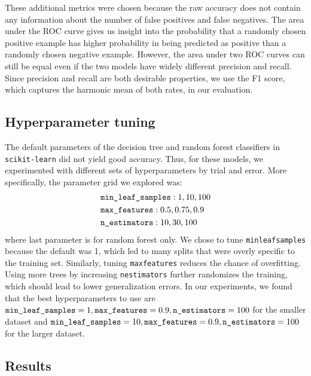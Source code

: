 \documentclass{article} %
\begin{document}
These additional metrics were chosen because the raw accuracy does not contain any information about the number of false positives and false negatives. The area under the ROC curve gives us insight into the probability that a randomly chosen positive example has higher probability in being predicted as positive than a randomly chosen negative example. However, the area under two ROC curves can still be equal even if the two models have widely different precision and recall. Since precision and recall are both desirable properties, we use the F1 score, which captures the harmonic mean of both rates, in our evaluation.

\subsection{Hyperparameter tuning}

The default parameters of the decision tree and random forest classifiers in \texttt{scikit-learn} did not yield good accuracy. Thus, for these models, we experimented with different sets of hyperparameters by trial and error. More specifically, the parameter grid we explored was:
\begin{align*}
&\texttt{min\textunderscore leaf\textunderscore samples}: 1, 10, 100\\
&\texttt{max\textunderscore features}: 0.5, 0.75, 0.9\\
&\texttt{n\textunderscore estimators}: 10, 30, 100
\end{align*}
where last parameter is for random forest only. We chose to tune \texttt{min\textunderscore leaf\textunderscore samples} because the default was 1, which led to many splits that were overly specific to the training set. Similarly, tuning \texttt{max\textunderscore features} reduces the chance of overfitting. Using more trees by increasing \texttt{n\textunderscore estimators} further randomizes the training, which should lead to lower generalization errors. In our experiments, we found that the best hyperparameters to use are $\texttt{min\textunderscore leaf\textunderscore samples} = 1, \texttt{max\textunderscore features} = 0.9, \texttt{n\textunderscore estimators} = 100$ for the smaller dataset and $\texttt{min\textunderscore leaf\textunderscore samples} = 10, \texttt{max\textunderscore features} = 0.9, \texttt{n\textunderscore estimators} = 100$ for the larger dataset.

\subsection{Results}
\end{document}
